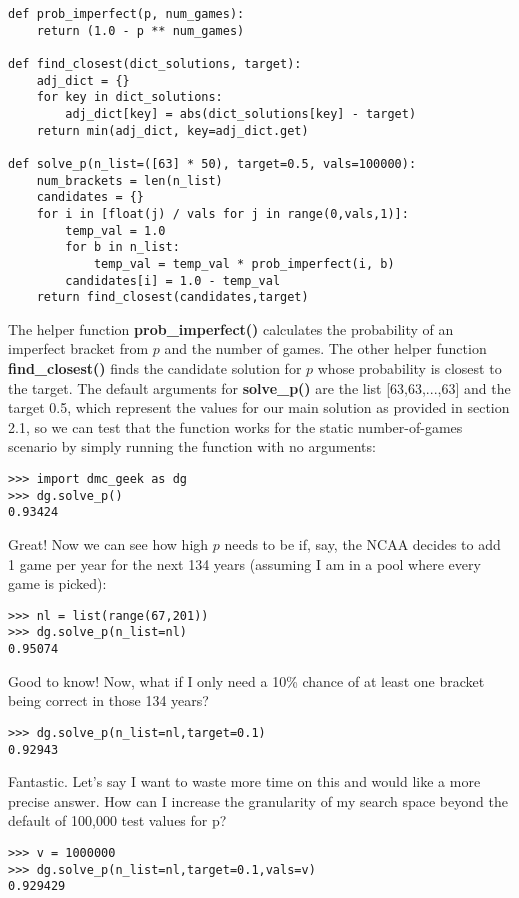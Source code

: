 \documentclass{article}
\begin{document}
\begin{lstlisting}
def prob_imperfect(p, num_games):
    return (1.0 - p ** num_games)

def find_closest(dict_solutions, target):
    adj_dict = {}
    for key in dict_solutions:
        adj_dict[key] = abs(dict_solutions[key] - target)
    return min(adj_dict, key=adj_dict.get)

def solve_p(n_list=([63] * 50), target=0.5, vals=100000):
    num_brackets = len(n_list)
    candidates = {}
    for i in [float(j) / vals for j in range(0,vals,1)]:
        temp_val = 1.0
        for b in n_list:
            temp_val = temp_val * prob_imperfect(i, b)
        candidates[i] = 1.0 - temp_val
    return find_closest(candidates,target)
\end{lstlisting}
\vspace{5mm}
The helper function \textbf{prob\_imperfect()} calculates the probability of an imperfect bracket from $p$ and the number of games. The other helper function \textbf{find\_closest()} finds the candidate solution for $p$ whose probability is closest to the target. The default arguments for \textbf{solve\_p()} are the list [63,63,...,63] and the target 0.5, which represent the values for our main solution as provided in section 2.1, so we can test that the function works for the static number-of-games scenario by simply running the function with no arguments:
\vspace{5mm}
\begin{lstlisting}
>>> import dmc_geek as dg
>>> dg.solve_p()
0.93424
\end{lstlisting}
\vspace{5mm}
Great! Now we can see how high $p$ needs to be if, say, the NCAA decides to add 1 game per year for the next 134 years (assuming I am in a pool where every game is picked):
\vspace{5mm}
\begin{lstlisting}
>>> nl = list(range(67,201))
>>> dg.solve_p(n_list=nl)
0.95074
\end{lstlisting}
\vspace{5mm}
Good to know! Now, what if I only need a 10\% chance of at least one bracket being correct in those 134 years?
\vspace{5mm}
\begin{lstlisting}
>>> dg.solve_p(n_list=nl,target=0.1)
0.92943
\end{lstlisting}
\vspace{5mm}
Fantastic. Let's say I want to waste more time on this and would like a more precise answer. How can I increase the granularity of my search space beyond the default of 100,000 test values for p?
\vspace{5mm}
\begin{lstlisting}
>>> v = 1000000
>>> dg.solve_p(n_list=nl,target=0.1,vals=v)
0.929429
\end{lstlisting}
\end{document}
